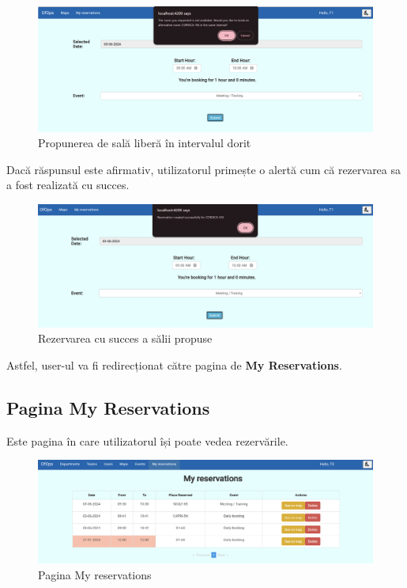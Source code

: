\begin{figure}[!htb]
    \centering
    \includegraphics[width=0.9\linewidth]{images/sicily rezerv2.png}
    \caption{Propunerea de sală liberă în intervalul dorit}
    \label{fig:sicily rezerv2.png}
\end{figure}

Dacă răspunsul este afirmativ, utilizatorul primește o alertă cum că rezervarea sa a fost realizată cu succes.

\begin{figure}[!htb]
    \centering
    \includegraphics[width=0.9\linewidth]{images/sicily rezerv3.png}
    \caption{Rezervarea cu succes a sălii propuse}
    \label{fig:sicily rezerv3.png}
\end{figure}

Astfel, user-ul va fi redirecționat către pagina de 
\textbf{My Reservations}.

\subsection{Pagina \textbf{My Reservations}}

Este pagina în care utilizatorul își poate vedea rezervările.

\begin{figure}[!htb]
    \centering
    \includegraphics[width=0.9\linewidth]{images/myres.png}
    \caption{Pagina My reservations}
    \label{fig:myres}
\end{figure}

